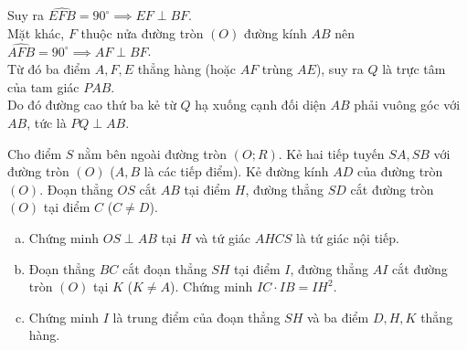 \begin{bt}
{\begin{enumerate}[a)]
	Suy ra $\widehat{EFB} = 90^\circ \implies EF \perp BF$.\\
	Mặt khác, $F$ thuộc nửa đường tròn $(O)$ đường kính $AB$ nên $\widehat{AFB} = 90^\circ \implies AF \perp BF$.\\
	Từ đó ba điểm $A, F, E$ thẳng hàng (hoặc $AF$ trùng $AE$), suy ra $Q$ là trực tâm của tam giác $PAB$.\\
	Do đó đường cao thứ ba kẻ từ $Q$ hạ xuống cạnh đối diện $AB$ phải vuông góc với $AB$, tức là $PQ \perp AB$.
\end{enumerate}
}
\end{bt}

\begin{bt}%
Cho điểm $S$ nằm bên ngoài đường tròn $(O; R)$. Kẻ hai tiếp tuyến $SA, SB$ với đường tròn $(O)$ ($A, B$ là các tiếp điểm). Kẻ đường kính $AD$ của đường tròn $(O)$. Đoạn thẳng $OS$ cắt $AB$ tại điểm $H$, đường thẳng $SD$ cắt đường tròn $(O)$ tại điểm $C$ ($C \ne D$).
\begin{enumerate}[a)]
	\item Chứng minh $OS \perp AB$ tại $H$ và tứ giác $AHCS$ là tứ giác nội tiếp.
	\item Đoạn thẳng $BC$ cắt đoạn thẳng $SH$ tại điểm $I$, đường thẳng $AI$ cắt đường tròn $(O)$ tại $K$ ($K \ne A$). Chứng minh $IC \cdot IB = IH^2$.
	\item Chứng minh $I$ là trung điểm của đoạn thẳng $SH$ và ba điểm $D, H, K$ thẳng hàng.
\end{enumerate}
\end{bt}
